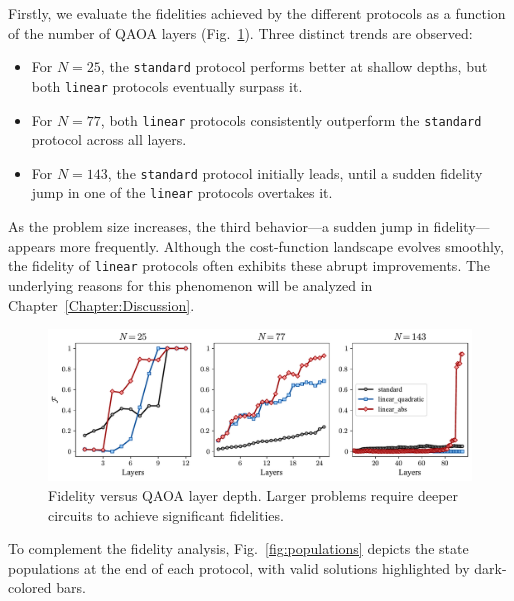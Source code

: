Firstly, we evaluate the fidelities achieved by the different protocols as a function of the number of QAOA layers (Fig.~\ref{fig:fidelity_layers}). Three distinct trends are observed:  
\begin{itemize}
    \item For $N = 25$, the \texttt{standard} protocol performs better at shallow depths, but both \texttt{linear} protocols eventually surpass it.  
    \item For $N = 77$, both \texttt{linear} protocols consistently outperform the \texttt{standard} protocol across all layers.  
    \item For $N = 143$, the \texttt{standard} protocol initially leads, until a sudden fidelity jump in one of the \texttt{linear} protocols overtakes it.  
\end{itemize}

As the problem size increases, the third behavior---a sudden jump in fidelity---appears more frequently. Although the cost-function landscape evolves smoothly, the fidelity of \texttt{linear} protocols often exhibits these abrupt improvements. The underlying reasons for this phenomenon will be analyzed in Chapter~\ref{Chapter:Discussion}.  

\begin{figure}[h]
    \centering
    \includegraphics[width=1\textwidth]{04-results/figs/fidelity_layers_2577143.pdf}
    \caption{Fidelity versus QAOA layer depth. Larger problems require deeper circuits to achieve significant fidelities.}
    \label{fig:fidelity_layers}
\end{figure}

To complement the fidelity analysis, Fig.~\ref{fig:populations} depicts the state populations
at the end of each protocol, with valid solutions highlighted by dark-colored bars.


